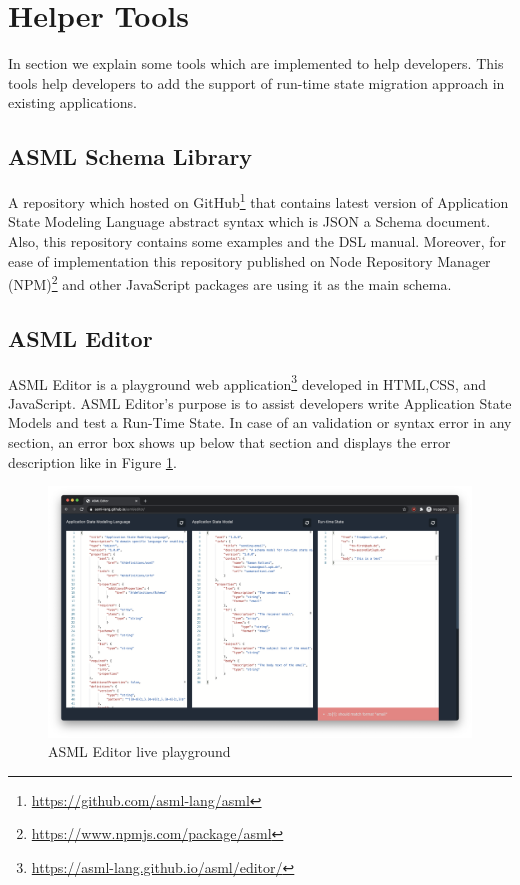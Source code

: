 \section{Helper Tools}
In section we explain some tools which are implemented to help developers. This tools help developers to add the support of run-time state migration approach in existing applications.
\subsection{ASML Schema Library}
A repository which hosted on GitHub\footnote{\url{https://github.com/asml-lang/asml}} that contains latest version of Application State Modeling Language abstract syntax which is JSON a Schema document. Also, this repository contains some examples and the DSL manual. Moreover, for ease of implementation this repository published on Node Repository Manager (NPM)\footnote{\url{https://www.npmjs.com/package/asml}}
 and other JavaScript packages are using it as the main schema.
 

\subsection{ASML Editor}
ASML Editor is a playground web application\footnote{\url{https://asml-lang.github.io/asml/editor/}} developed in HTML,CSS, and JavaScript. ASML Editor's purpose is to assist developers write Application State Models and test a Run-Time State. In case of an validation or syntax error in any section, an error box shows up below that section and displays the error description like in Figure \ref{fig:asml-editor}. 
\FloatBarrier \begin{figure}[H]
    \includegraphics[width=\linewidth]{../figures/asml-editor.png}
    \centering
    \caption{ASML Editor live playground}
    \label{fig:asml-editor}
\end{figure} \FloatBarrier

